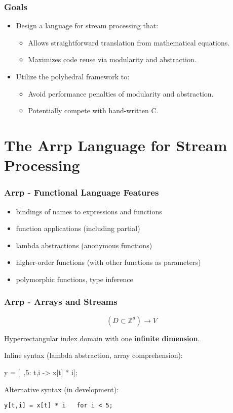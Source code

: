 \documentclass{beamer}
\begin{document}
\begin{frame}
\frametitle{Goals}

\begin{itemize}
\item Design a language for stream processing that:
\begin{itemize}
  \item Allows straightforward translation from mathematical equations.
  \item Maximizes code reuse via modularity and abstraction.
\end{itemize}
\item Utilize the polyhedral framework to:
\begin{itemize}
  \item Avoid performance penalties of modularity and abstraction.
  \item Potentially compete with hand-written C.
\end{itemize}
\end{itemize}

\end{frame}


\section{The Arrp Language for Stream Processing}


\begin{frame}
\frametitle{Arrp - Functional Language Features}

\begin{itemize}
\item bindings of names to expressions and functions
\item function applications (including partial)
\item lambda abstractions (anonymous functions)
\item higher-order functions (with other functions as parameters)
\item polymorphic functions, type inference
\end{itemize}

\end{frame}

\begin{frame}[fragile]
\frametitle{Arrp - Arrays and Streams}

\[(D \subset \mathbb{Z}^d) \to V\]

Hyperrectangular index domain with one \textbf{infinite dimension}.
\vspace{\baselineskip}

Inline syntax (lambda abstraction, array comprehension):

\begin{semiverbatim}
y = [~,5: t,i -> x[t] * i];
\end{semiverbatim}

Alternative syntax (in development):

\begin{verbatim}
y[t,i] = x[t] * i   for i < 5;
\end{verbatim}

\end{frame}
\end{document}
